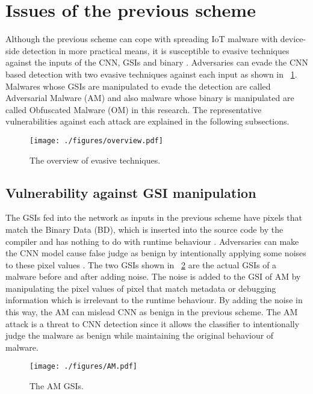 \section{Issues of the previous scheme } 
Although the previous scheme can cope with spreading IoT malware with device-side detection in more practical means, it is susceptible to evasive techniques against the inputs of the CNN, GSIs and binary \cite{attack1, attack2}.
Adversaries can evade the CNN based detection with two evasive techniques against each input as shown in \figurename~\ref{fig:ov}.
Malwares whose GSIs are manipulated to evade the detection are called Adversarial Malware (AM) and also malware whose binary is manipulated are called Obfuscated Malware (OM) in this research.  
The representative vulnerabilities against each attack are explained in the following subsections.

\begin{figure}[h]
 \centering
 \texttt{[image: ./figures/overview.pdf]}
 \caption{The overview of evasive techniques.} 
 \label{fig:ov}
\end{figure}
\newpage

\subsection{Vulnerability against GSI manipulation}
The GSIs fed into the network as inputs in the previous scheme have pixels that match the Binary Data (BD), which is inserted into the source code by the compiler and has nothing to do with runtime behaviour \cite{am}.
Adversaries can make the CNN model cause false judge as benign by intentionally applying some noises to these pixel values \cite{am}.
The two GSIs shown in \figurename~\ref{fig:amGSI} are the actual GSIs of a malware before and after adding noise.
The noise is added to the GSI of AM by manipulating the pixel values of pixel that match metadata or debugging information which is irrelevant to the runtime behaviour.
By adding the noise in this way, the AM can mislead CNN as benign in the previous scheme.
The AM attack is a threat to CNN detection since it allows the classifier to intentionally judge the malware as benign while maintaining the original behaviour of malware.

\begin{figure}[h]
 \centering
 \texttt{[image: ./figures/AM.pdf]}
 \caption{The AM GSIs.} 
 \label{fig:amGSI}
\end{figure}
\newpage
